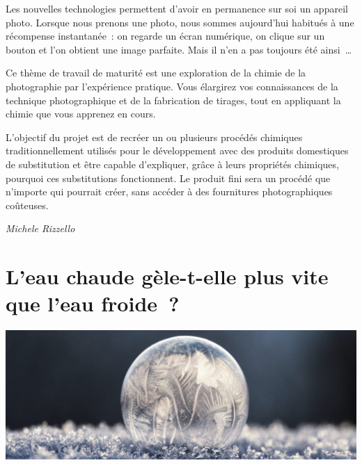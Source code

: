\documentclass[
  10pt,
  french,
  a5paper,
  openany]{book}
\newenvironment{signature}{\begin{flushright}}{\end{flushright}}
\begin{document}
Les nouvelles technologies permettent d'avoir en permanence sur soi un appareil photo. Lorsque nous prenons une photo, nous sommes aujourd'hui habitués à une récompense instantanée~: on regarde un écran numérique, on clique sur un bouton et l'on obtient une image parfaite. Mais il n'en a pas toujours été ainsi~\ldots{}

Ce thème de travail de maturité est une exploration de la chimie de la photographie par l'expérience pratique. Vous élargirez vos connaissances de la technique photographique et de la fabrication de tirages, tout en appliquant la chimie que vous apprenez en cours.

L'objectif du projet est de recréer un ou plusieurs procédés chimiques traditionnellement utilisés pour le développement avec des produits domestiques de substitution et être capable d'expliquer, grâce à leurs propriétés chimiques, pourquoi ces substitutions fonctionnent. Le produit fini sera un procédé que n'importe qui pourrait créer, sans accéder à des fournitures photographiques coûteuses.

\begin{signature}
\emph{Michele Rizzello}

\end{signature}

\hypertarget{leau-chaude-guxe8le-t-elle-plus-vite-que-leau-froide}{%
\chapter{\texorpdfstring{L'eau chaude gèle-t-elle \linebreak plus vite que l'eau froide~?}{L'eau chaude gèle-t-elle plus vite que l'eau froide~?}}\label{leau-chaude-guxe8le-t-elle-plus-vite-que-leau-froide}}

\begin{center}
\includegraphics[width=1\textwidth,height=\textheight]{images/eau-chaude.jpg}

\end{center}
\end{document}

